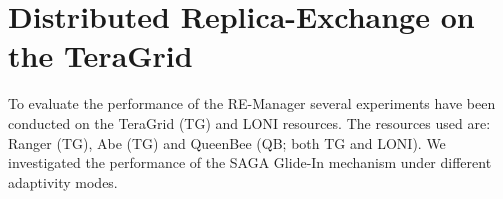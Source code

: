 \documentclass{rspublic}
\newcommand{\replicaagent}[1]{Replica-Agent }
\begin{document}
% 
% 
% 
% 




\section{Distributed Replica-Exchange on the TeraGrid}
\label{sec:exp}
        
To evaluate the performance of the RE-Manager several experiments have
been conducted on the TeraGrid (TG) and LONI resources. The resources
used are: Ranger (TG), Abe (TG) and QueenBee (QB; both TG and LONI).
We investigated the performance of the SAGA Glide-In mechanism under
different adaptivity modes.
\end{document}
